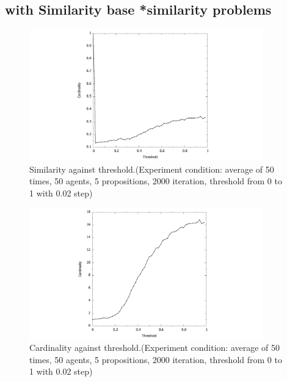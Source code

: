 \documentclass[a4paper,12pt]{article}
\begin{document}
\subsection{with Similarity base *similarity problems}
\begin{figure}[H]
	\centering
	\includegraphics[width=0.9\textwidth]{STh_simpdf}
	\caption{Similarity against threshold.(Experiment condition: average of 50 times, 50 agents, 5 propositions, 2000 iteration, threshold from 0 to 1 with 0.02 step)}\label{STh_simpdf}
\end{figure}
%
\begin{figure}[H]
	\centering
	\includegraphics[width=0.9\textwidth]{STh_cardpdf}
	\caption{Cardinality against threshold.(Experiment condition: average of 50 times, 50 agents, 5 propositions, 2000 iteration, threshold from 0 to 1 with 0.02 step)}\label{cardminhamm}
\end{figure}
\end{document}
